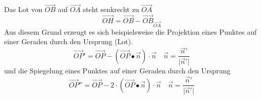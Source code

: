 Das Lot von $\overrightarrow{OB}$ auf $\overrightarrow{OA}$ steht senkrecht zu $\overrightarrow{OA}$
\begin{equation}
\boxed{\overrightarrow{OH}=\overrightarrow{OB}-\overrightarrow{OB}_{\overrightarrow{OA}}}
\end{equation}
Aus diesem Grund erzeugt es sich beispielsweise die Projektion eines Punktes auf einer Geraden durch den Ursprung (Lot).
\begin{equation}
\boxed{\overrightarrow{OP}'=\overrightarrow{OP}-\left(\overrightarrow{OP}\bullet \overrightarrow{n}\right)\cdot \overrightarrow{n}}\quad \boxed{\overrightarrow{n}=\dfrac{\overrightarrow{n}'}{\Big\vert\overrightarrow{n}'\Big\vert}}
\end{equation}
und die Spiegelung eines Punktes auf einer Geraden durch den Ursprung
\begin{equation}
\boxed{\overrightarrow{OP}''=\overrightarrow{OP}-2\cdot \left(\overrightarrow{OP}\bullet \overrightarrow{n}\right)\cdot \overrightarrow{n}}\quad \boxed{\overrightarrow{n}=\dfrac{\overrightarrow{n}'}{\Big\vert\overrightarrow{n}'\Big\vert}}
\end{equation}
